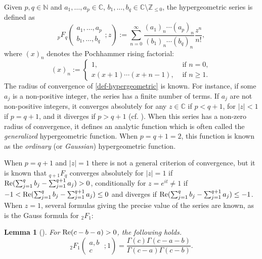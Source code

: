 \documentclass[12pt, pdflatex, a4paper]{article}
\theoremstyle{plain}
\newtheorem{lemma}[thm]{Lemma}
\theoremstyle{definition}
\def\C{{\mathbb C}}
\def\N{{\mathbb N}}
\def\Re{\text{\normalfont{Re}}}
\def\Z{{\mathbb Z}}
\begin{document}
Given $p, q \in \N$ and $a_1, \ldots, a_p \in \C$, $b_1, \ldots, b_q \in \C\setminus \Z_{\leq 0}$, the hypergeometric series is defined as
\begin{equation}\label{def-hypergeometric}
{}_pF_q\left(
\begin{matrix}
a_1, \ldots, a_p\\
b_1, \ldots, b_q 
\end{matrix}
; z\right) := \sum_{n=0}^{\infty} \frac{(a_1)_n \cdots (a_p)_n}{(b_1)_n \cdots (b_q)_n}\frac{z^n}{n!},
\end{equation}
where $(x)_n$ denotes the Pochhammer rising factorial:
\begin{equation}\label{Pochhamer-symbol}
(x)_n := \begin{cases}
1, & \text{ if } n = 0,\\
x (x+1) \cdots (x+n-1), & \text{ if } n \geq 1.
\end{cases}
\end{equation}
The radius of convergence of \eqref{def-hypergeometric} is known. For instance, if some $a_j$ is a non-positive integer, the series has a finite number of terms. If $a_j$ are not non-positive integers, it converges absolutely for any $z \in \C$ if $p < q +1 $, for $|z| < 1$ if $p = q+1$, and it diverges if $p > q+1$ (cf. \cite[Thm. 2.1.1]{AAR99}). When this series has a non-zero radius of convergence, it defines an analytic function which is often called the \emph{generalized} hypergeometric function. When $p = q+ 1 = 2$, this function is known as the \emph{ordinary} (or \emph{Gaussian}) hypergeometric function.

When $p = q+1$ and $|z| = 1$ there is not a general criterion of convergence, but it is known that ${}_{q+1}F_q$ converges absolutely for $|z|=1$ if $\Re(\sum_{j=1}^q b_j - \sum_{j=1}^{q+1} a_j) >0$, conditionally for $z = e^{it} \neq 1$ if $-1 < \Re(\sum_{j=1}^q b_j - \sum_{j=1}^{q+1}a_j) \leq 0$ and diverges if $ \Re(\sum_{j=1}^q b_j - \sum_{j=1}^{q+1}a_j) \leq -1$. When $z = 1$, several formulas giving the precise value of the series are known, as is the Gauss formula for ${}_2F_1$:

\begin{lemma}[{\normalfont\cite[Eq. (48)]{Gau12}}] For $\Re(c-b-a)> 0$, the following holds.
\begin{equation*}
{}_2F_1\left(\begin{matrix}
a, b\\
c
\end{matrix}\; ; 1 \right) = \frac{\Gamma(c)\Gamma(c-a-b)}{\Gamma(c-a)\Gamma(c-b)}.
\end{equation*}
\end{lemma}
\end{document}
